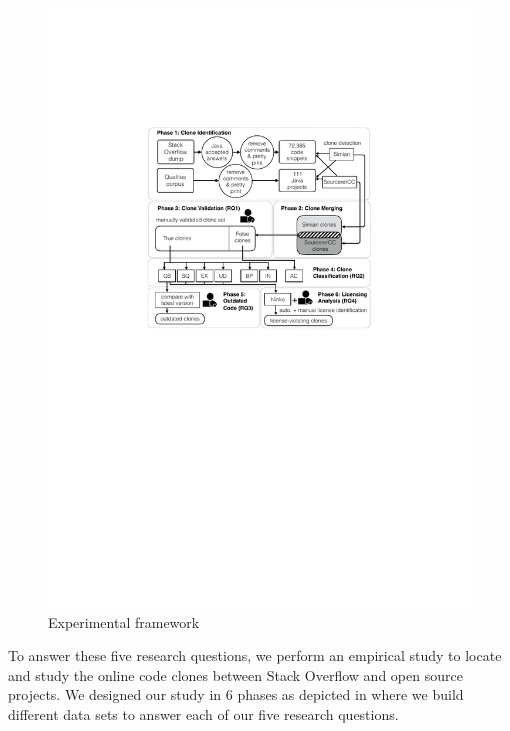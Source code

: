 \documentclass[10pt,journal,compsoc]{IEEEtran}
\begin{document}
\begin{figure}
	\centering
	\includegraphics[width=\linewidth]{exp_framework_new}
	\caption{Experimental framework}
	\label{fig:exp_framework}
\end{figure}

To answer these five research questions, we perform an empirical study to
locate and study the online code clones between Stack Overflow and open source
projects. 
%
%
We designed our study in 6 phases as depicted in  where
we build different data sets to answer each of our five research
questions. 
\end{document}
